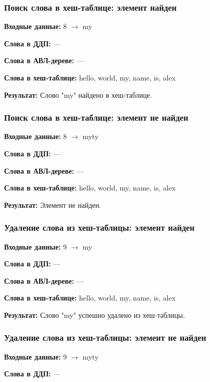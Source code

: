 \documentclass[a4paper,12pt]{extarticle}
\begin{document}

\subsubsection{Поиск слова в хеш-таблице: элемент найден}

\textbf{Входные данные: }
8 $\rightarrow$ my

\textbf{Слова в ДДП: }
---

\textbf{Слова в АВЛ-дереве: }
---

\textbf{Слова в хеш-таблице: }
hello, world, my, name, is, alex

\textbf{Результат: }
Слово "my" найдено в хеш-таблице.


\subsubsection{Поиск слова в хеш-таблице: элемент не найден}

\textbf{Входные данные: }
8 $\rightarrow$ myty

\textbf{Слова в ДДП: }
---

\textbf{Слова в АВЛ-дереве: }
---

\textbf{Слова в хеш-таблице: }
hello, world, my, name, is, alex

\textbf{Результат: }
Элемент не найден.

\subsubsection{Удаление слова из хеш-таблицы: элемент найден}

\textbf{Входные данные: }
9 $\rightarrow$ my

\textbf{Слова в ДДП: }
---

\textbf{Слова в АВЛ-дереве: }
---

\textbf{Слова в хеш-таблице: }
hello, world, my, name, is, alex

\textbf{Результат: }
Слово "my" успешно удалено из хеш-таблицы.


\subsubsection{Удаление слова из хеш-таблицы: элемент не найден}

\textbf{Входные данные: }
9 $\rightarrow$ myty

\textbf{Слова в ДДП: }
---
\end{document}
